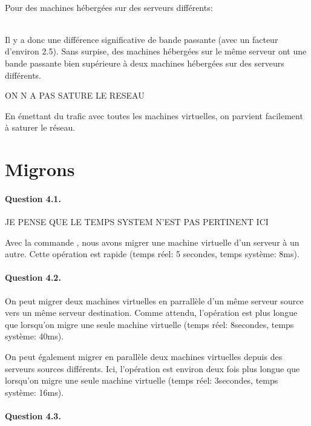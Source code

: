 \documentclass[12pt]{article}
\begin{document}
\\

Pour des machines hébergées sur des serveurs différents:

\\

Il y a donc une différence significative de bande passante (avec un facteur d'environ 2.5). Sans surpise, des machines hébergées sur le même serveur ont une bande passante bien supérieure à deux machines hébergées sur des serveurs différents.

ON N A PAS SATURE LE RESEAU

En émettant du trafic avec toutes les machines virtuelles, on parvient facilement à saturer le réseau.

\section{Migrons}
\paragraph{Question 4.1.}


JE PENSE QUE LE TEMPS SYSTEM N'EST PAS PERTINENT ICI

Avec la commande , nous avons migrer une machine virtuelle d'un serveur à un autre. Cette opération est rapide (temps réel: 5 secondes, temps système: 8ms).

\paragraph{Question 4.2.}

On peut migrer deux machines virtuelles en parrallèle d'un même serveur source vers un même serveur destination. Comme attendu, l'opération est plus longue que lorsqu'on migre une seule machine virtuelle (temps réel: 8secondes, temps système: 40ms).


On peut également migrer en parallèle deux machines virtuelles depuis des serveurs sources différents. Ici, l'opération est environ deux fois plus longue que lorsqu'on migre une seule machine virtuelle (temps réel: 3secondes, temps système: 16ms).



\paragraph{Question 4.3.}
\end{document}
